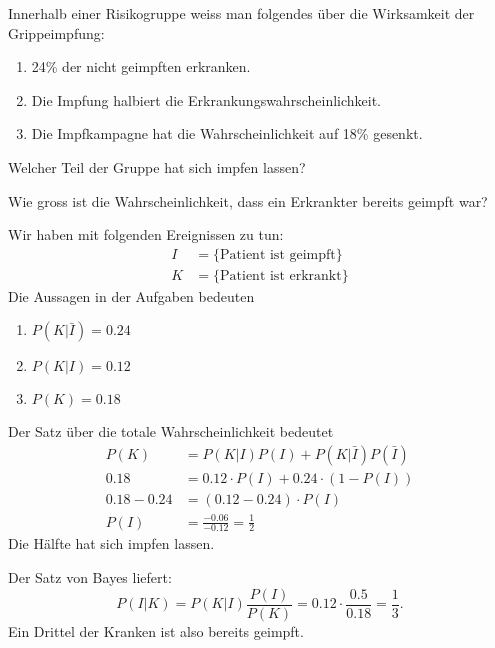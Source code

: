 Innerhalb einer Risiko\-gruppe weiss man folgendes über die Wirksamkeit
der Grippe\-impfung:
\begin{enumerate}
\item 24\% der nicht geimpften erkranken.
\item Die Impfung halbiert die Erkrankungswahrscheinlichkeit.
\item Die Impfkampagne hat die Wahrscheinlichkeit
auf 18\% gesenkt.
\end{enumerate}
\begin{teilaufgaben}
\item Welcher Teil der Gruppe hat sich impfen lassen?
\item Wie gross ist die Wahrscheinlichkeit, dass ein Erkrankter
bereits geimpft war?
\end{teilaufgaben}

\begin{loesung}
Wir haben mit folgenden Ereignissen zu tun:
\begin{align*}
I&=\{\text{Patient ist geimpft}\}\\
K&=\{\text{Patient ist erkrankt}\}
\end{align*}
Die Aussagen in der Aufgaben bedeuten
\begin{enumerate}
\item $P(K|\bar I)=0.24$
\item $P(K|I)=0.12$
\item $P(K)=0.18$
\end{enumerate}
\begin{teilaufgaben}
\item
Der Satz über die totale Wahrscheinlichkeit bedeutet
\begin{align*}
P(K)&=P(K|I)P(I)+P(K|\bar I)P(\bar I)
\\
0.18&=0.12\cdot P(I)+0.24\cdot (1-P(I))
\\
0.18-0.24&=(0.12-0.24)\cdot P(I)
\\
P(I)&=\frac{-0.06}{-0.12}=\frac12
\end{align*}
Die Hälfte hat sich impfen lassen.
\item
Der Satz von Bayes liefert:
\[
P(I|K)=P(K|I)\frac{P(I)}{P(K)}=0.12\cdot\frac{0.5}{0.18}=\frac13.
\]
Ein Drittel der Kranken ist also bereits geimpft.
\qedhere
\end{teilaufgaben}
\end{loesung}

